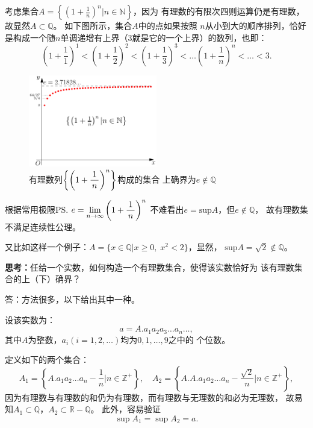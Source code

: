 考虑集合$A=\left\{\left(1+\frac 1n\right)^n
|n\in\mathbb{N}\right\}$，因为
有理数的有限次四则运算仍是有理数，故显然$A\subset\mathbb{Q}$。
如下图所示，集合$A$中的点如果按照
$n$从小到大的顺序排列，恰好是构成一个随$n$单调递增有上界（$3$就是它的一个上界）的数列，也即：
$$\left(1+\frac11\right)^1<\left(1+\frac12\right)^2<\left(1+\frac13\right)^3<\ldots
\left(1+\frac1n\right)^n<\ldots<3.$$
\begin{figure}[h]
	\centering
	\includegraphics[width=0.5\textwidth]{./images/ch01/e-notin-N.pdf}
	\caption{有理数列$\left\{\left(1+\displaystyle\frac{\,{1}\,}{\,{n}\,}\right)^n\right\}$构成的集合
	上确界为$e\notin\mathbb{Q}$}
	\label{fig:2.1}
\end{figure}
根据常用极限\ps{$e=\lim\limits_{n\to\infty}\left(1+\displaystyle\frac{\,{1}\,}{\,{n}\,}\right)^n$}
不难看出$e=\mathrm{sup}A$，但$e\notin\mathbb{Q}$，
故有理数集不满足连续性公理。\fin

又比如这样一个例子：$A=\{x\in\mathbb{Q}|x\geq 0,\;x^2<2\}$，显然，
$\mathrm{sup}A=\sqrt2\notin\mathbb{Q}$。
\fi

\bs
{\bf 思考：}任给一个实数，如何构造一个有理数集合，使得该实数恰好为
该有理数集合的上（下）确界？

\ifhint
答：方法很多，以下给出其中一种。

设该实数为：
$$a=A.a_1a_2a_3\ldots a_n\ldots,$$
其中$A$为整数，$a_i(i=1,2,\ldots)$均为$0,1,\ldots,9$之中的
个位数。

定义如下的两个集合：
$$A_1=\left\{A.a_1a_2\ldots a_n-\frac1n
\Big|n\in\mathbb{Z}^+\right\},
\quad
A_2=\left\{A.A.a_1a_2\ldots a_n-\frac{\sqrt2}n\Big|
n\in\mathbb{Z}^+\right\},$$
因为有理数与有理数的和仍为有理数，而有理数与无理数的和必为无理数，
故易知$A_1\subset\mathbb{Q}$，$A_2\subset\mathbb{R}-\mathbb{Q}$。
此外，容易验证
$$\sup A_1=\sup A_2=a.$$
\fin
\fi

